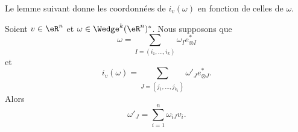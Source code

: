 Le lemme suivant donne les coordonnées de \( i_v(\omega)\) en fonction de celles de \( \omega\).
\begin{lemma}		\label{LEMooOBUVooBHpDZX}
	Soient \( v\in \eR^n\) et \( \omega\in \Wedge^k(\eR^n)^*\). Nous supposons que
	\begin{equation}
		\omega=\sum_{I=(i_1,\ldots,i_k)}\omega_Ie^*_{\otimes I}
	\end{equation}
	et
	\begin{equation}
		i_v(\omega)=\sum_{J=(j_1,\ldots,j_{k_1})}\omega'_Je^*_{\otimes J}.
	\end{equation}
	Alors
	\begin{equation}
		\omega'_J=\sum_{i=1}^n\omega_{iJ}v_i.
	\end{equation}
\end{lemma}

